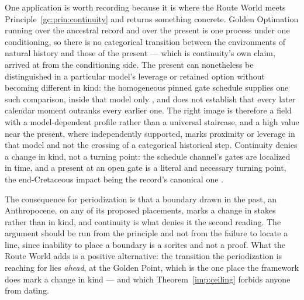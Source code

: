 \begin{remark}\label{gc:rem:periodization}
One application is worth recording because it is where the Route World
meets Principle~\ref{gc:prin:continuity} and returns something concrete. Golden Optimation running over the ancestral record and over the present
is one process under one conditioning, so there is no categorical
transition between the environments of natural history and those of the
present --- which is continuity's own claim, arrived at from the
conditioning side. The present can nonetheless be distinguished in a
particular model's leverage or retained option without becoming
different in kind: the homogeneous pinned gate schedule supplies one such
comparison, inside that model only \cite{GoldenTechnoanatomy}, and does
not establish that every later calendar moment outranks every earlier
one. The right image is therefore a field with a model-dependent profile
rather than a universal staircase, and a high value near the present,
where independently supported, marks proximity or leverage in that model
and not the crossing of a categorical historical step. Continuity
denies a change in kind, not a turning point: the schedule channel's
gates are localized in time, and a present at an open gate is a literal
and necessary turning point, the end-Cretaceous impact being the
record's canonical one \cite{GoldenTechnoanatomy}.

The consequence for periodization is that a boundary drawn in the past, an Anthropocene, on any of its proposed placements, marks a
change in stakes rather than in kind, and continuity is what denies it
the second reading. The argument should be run from the principle and
not from the failure to locate a line, since inability to place a
boundary is a sorites and not a proof. What the Route World adds is a
positive alternative: the transition the periodization is reaching for
lies \emph{ahead}, at the Golden Point, which is the one place the
framework does mark a change in kind --- and which
Theorem~\ref{imp:ceiling} forbids anyone from dating.
\end{remark}



